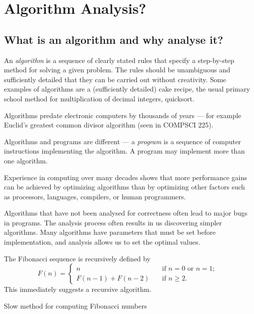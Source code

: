 \part{Algorithm Analysis?} \label{ch:alganal}


\chapter{What is an algorithm and why analyse it?} %

An \emph{algorithm} is a sequence of clearly stated rules that
specify a step-by-step method for solving a given problem.
The rules should be unambiguous and
sufficiently detailed that they can be carried out without creativity.
Some examples of algorithms are a (sufficiently detailed) cake recipe,
the usual primary school method for multiplication of decimal integers, quicksort.

Algorithms predate electronic computers by thousands of years --- for example
Euclid's greatest common divisor algorithm (seen in COMPSCI 225).

Algorithms and programs are different --- a \emph{program} is a sequence of computer instructions implementing 
the algorithm. A program may implement more than one algorithm.

Experience in computing over many decades shows that more performance gains can be achieved 
by optimizing algorithms than by optimizing other factors such as
processors, languages, compilers, or human programmers.

Algorithms that have not been analysed for correctness often lead to 
major bugs in programs. The analysis process often results in us discovering simpler algorithms.
Many algorithms have parameters that must be set before implementation, and analysis allows us to set the optimal values.


\begin{Boxample}
The Fibonacci sequence is recursively defined by 
$$
F(n) = 
  \left\{\begin{array}{ll}
	n & \quad \text{if } n = 0 \text{ or } n = 1; \\ 
    F(n - 1) + F(n - 2) & \quad \text{if } n \geq 2 \text{.}
  \end{array}
  \right.
$$
This immediately suggests a recursive algorithm.
\end{Boxample}

\begin{algorithm}[H]
  \caption{Slow method for computing Fibonacci numbers} 
  \label{alg:slowfib}
\begin{algorithmic}[1]
\EndIf
\EndFunction
\end{algorithmic}
\end{algorithm}

